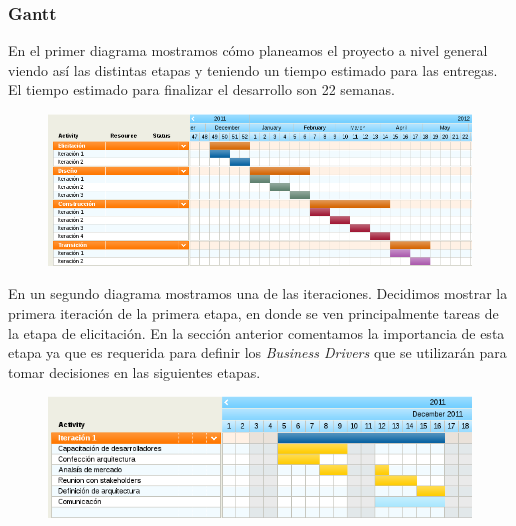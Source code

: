 \subsubsection{Gantt}

En el primer diagrama mostramos cómo planeamos el proyecto a nivel general viendo así las distintas etapas y teniendo un tiempo estimado para las entregas. El tiempo estimado para
finalizar el desarrollo son 22 semanas.	

\begin{figure}[H]
 \includegraphics[scale=0.7]{./ganttetapas.png}
\end{figure}

En un segundo diagrama mostramos una de las iteraciones. Decidimos mostrar la primera iteración de la primera etapa, en donde se ven principalmente tareas de la etapa de elicitación. En la sección anterior comentamos la importancia de esta etapa ya que es requerida para definir los \emph{Business Drivers} que se utilizar\'an para tomar decisiones en las siguientes etapas.

\begin{figure}[H]
\begin{center}
 \includegraphics[scale=0.7]{./ganttiteracion.png}
\end{center}
\end{figure}

\renewcommand{\labelitemi}{$\tiny \blacksquare$}


